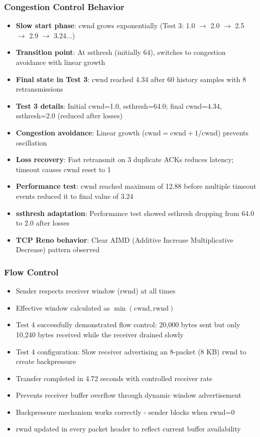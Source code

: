 \documentclass[11pt,a4paper]{article}
\begin{document}
\subsubsection{Congestion Control Behavior}
\begin{itemize}
    \item \textbf{Slow start phase}: cwnd grows exponentially (Test 3: 1.0 $\rightarrow$ 2.0 $\rightarrow$ 2.5 $\rightarrow$ 2.9 $\rightarrow$ 3.24...)
    \item \textbf{Transition point}: At ssthresh (initially 64), switches to congestion avoidance with linear growth
    \item \textbf{Final state in Test 3}: cwnd reached 4.34 after 60 history samples with 8 retransmissions
    \item \textbf{Test 3 details}: Initial cwnd=1.0, ssthresh=64.0; final cwnd=4.34, ssthresh=2.0 (reduced after losses)
    \item \textbf{Congestion avoidance}: Linear growth ($\text{cwnd} = \text{cwnd} + 1/\text{cwnd}$) prevents oscillation
    \item \textbf{Loss recovery}: Fast retransmit on 3 duplicate ACKs reduces latency; timeout causes cwnd reset to 1
    \item \textbf{Performance test}: cwnd reached maximum of 12.88 before multiple timeout events reduced it to final value of 3.24
    \item \textbf{ssthresh adaptation}: Performance test showed ssthresh dropping from 64.0 to 2.0 after losses
    \item \textbf{TCP Reno behavior}: Clear AIMD (Additive Increase Multiplicative Decrease) pattern observed
\end{itemize}

\subsubsection{Flow Control}
\begin{itemize}
    \item Sender respects receiver window (rwnd) at all times
    \item Effective window calculated as $\min(\text{cwnd}, \text{rwnd})$
    \item Test 4 successfully demonstrated flow control: 20,000 bytes sent but only 10,240 bytes received while the receiver drained slowly
    \item Test 4 configuration: Slow receiver advertising an 8-packet (8 KB) rwnd to create backpressure
    \item Transfer completed in 4.72 seconds with controlled receiver rate
    \item Prevents receiver buffer overflow through dynamic window advertisement
    \item Backpressure mechanism works correctly - sender blocks when rwnd=0
    \item rwnd updated in every packet header to reflect current buffer availability
\end{itemize}
\end{document}
